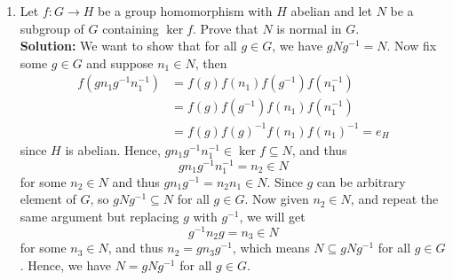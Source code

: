 \documentclass[12pt]{article}
\begin{document}
\begin{enumerate}
    \item Let $f:G\rightarrow H$ be a group homomorphism with $H$ abelian and let $N$ be a subgroup of $G$ containing $\ker f$.
    Prove that $N$ is normal in $G$. \\
    \textbf{Solution:} We want to show that for all \(g \in G\), we have \(gNg^{-1} = N \). Now fix some \(g \in G\) and suppose \(n_1 \in N\), then  
    \begin{align*}
        f \left( g n_1 g^{-1} n_1^{-1} \right) &= f(g) f \left( n_1  \right) f \left( g^{-1} \right) f \left( n_1^{-1} \right) \\
        &= f(g) f \left( g^{-1} \right) f(n_1) f \left( n_1^{-1} \right) \\
        &= f(g)f(g)^{-1} f(n_1) f(n_1)^{-1} = e_H
    \end{align*}
    since \(H\) is abelian. Hence, \(g n_1 g^{-1} n_1^{-1} \in \ker f \subseteq N  \), and thus 
    \[
        g n_1 g^{-1} n_1^{-1} = n_2 \in N  
    \] for some \(n_2 \in N\) and thus \(g n_1 g^{-1} = n_2 n_1 \in N \). Since \(g\) can be arbitrary element of \(G\), so \(gNg^{-1} \subseteq N \) for all \(g \in G\). Now given \(n_2 \in N\), and repeat the same argument but replacing \(g\) with \(g^{-1} \), we will get
    \[
        g^{-1} n_2 g = n_3 \in N
    \] for some \(n_3 \in N\), and thus \(n_2 = g n_3 g^{-1} \), which means \(N \subseteq g N g^{-1} \) for all \(g \in G\). Hence, we have \(N = g N g^{-1} \) for all \(g \in G\).   
\end{enumerate}
\end{document}
